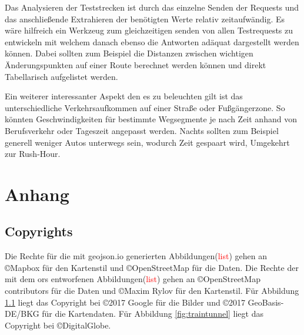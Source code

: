 \documentclass[12pt,a4paper]{article}
\newcommand\todo[1]{\textcolor{red}{#1}}
\begin{document}
Das Analysieren der Teststrecken ist durch das einzelne Senden der Requests und das anschließende Extrahieren der benötigten Werte relativ zeitaufwändig. Es wäre hilfreich ein Werkzeug zum gleichzeitigen senden von allen Testrequests zu entwickeln mit welchem danach ebenso die Antworten adäquat dargestellt werden können. Dabei sollten zum Beispiel die Distanzen zwischen wichtigen Änderungspunkten auf einer Route berechnet werden können und direkt Tabellarisch aufgelistet werden.

Ein weiterer interessanter Aspekt den es zu beleuchten gilt ist das unterschiedliche Verkehrsaufkommen auf einer Straße oder Fußgängerzone. So könnten Geschwindigkeiten für bestimmte Wegsegmente je nach Zeit anhand von Berufsverkehr oder Tageszeit angepasst werden. Nachts sollten zum Beispiel generell weniger Autos unterwegs sein, wodurch Zeit gespaart wird, Umgekehrt zur Rush-Hour.

\newpage
\printbibliography

\newpage
\section{Anhang}
\label{sec:anhang}
\subsection{Copyrights}
Die Rechte für die mit geojson.io generierten Abbildungen(\todo{list}) gehen an \copyright Mapbox für den Kartenstil und \copyright OpenStreetMap für die Daten.
Die Rechte der mit dem \gls{ors} entworfenen Abbildungen(\todo{list}) gehen an \copyright OpenStreetMap contributors für die Daten und \copyright Maxim Rylov für den Kartenstil.
Für Abbildung \ref{} liegt das Copyright bei \copyright 2017 Google für die Bilder und \copyright 2017 GeoBasis-DE/BKG für die Kartendaten.
Für Abbildung \ref{fig:traintunnel} liegt das Copyright bei \copyright DigitalGlobe.
\end{document}

